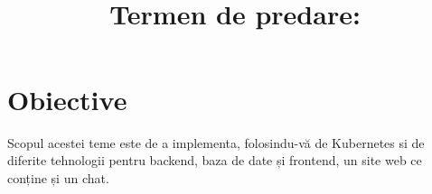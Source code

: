 \documentclass{article}
\title{
\textmd{\textbf{\MNClass \\ \MNTitle}}\\
\normalsize\vspace{0.1in}\small{Termen de predare: \MNDueDate}\\
}
\date{} %
\begin{document}
\maketitle





\section{Obiective}

Scopul acestei teme este de a implementa, folosindu-vă de Kubernetes si de diferite tehnologii pentru backend, baza de date și frontend, un site web ce conține și un chat.


\end{document}
